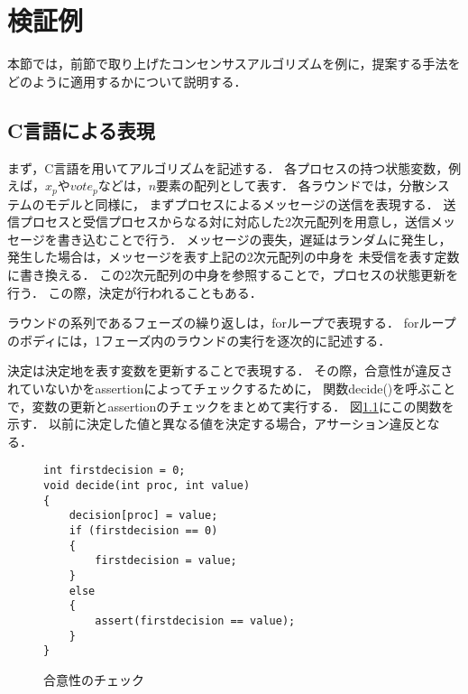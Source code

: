 \documentclass[technicalreport]{ieicej}
\theoremstyle{plain}
\begin{document}

    

\section{検証例}\label{sec:clang}

本節では，前節で取り上げたコンセンサスアルゴリズムを例に，提案する手法をどのように適用するかについて説明する．

\subsection{C言語による表現}


まず，C言語を用いてアルゴリズムを記述する．
各プロセスの持つ状態変数，例えば，$x_p$や$vote_p$などは，$n$要素の配列として表す．
各ラウンドでは，分散システムのモデルと同様に，
まずプロセスによるメッセージの送信を表現する．
送信プロセスと受信プロセスからなる対に対応した2次元配列を用意し，送信メッセージを書き込むことで行う．
メッセージの喪失，遅延はランダムに発生し，発生した場合は，メッセージを表す上記の2次元配列の中身を
未受信を表す定数に書き換える．
この2次元配列の中身を参照することで，プロセスの状態更新を行う．
この際，決定が行われることもある．

ラウンドの系列であるフェーズの繰り返しは，forループで表現する．
forループのボディには，1フェーズ内のラウンドの実行を逐次的に記述する．

決定は決定地を表す変数を更新することで表現する．
その際，合意性が違反されていないかをassertionによってチェックするために，
関数decide()を呼ぶことで，変数の更新とassertionのチェックをまとめて実行する．
図\ref{}にこの関数を示す．
以前に決定した値と異なる値を決定する場合，アサーション違反となる．

\begin{figure}[t]
    \begin{verbatim}
int firstdecision = 0;
void decide(int proc, int value) 
{
    decision[proc] = value;
    if (firstdecision == 0)
    {
        firstdecision = value;
    }
    else
    {
        assert(firstdecision == value);
    }
}
    \end{verbatim}
\caption{合意性のチェック}\label{fig:assert}
\end{figure}          
\end{document}
